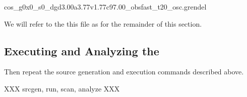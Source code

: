 \begin{snippet}
  cos_g0x0_s0_dgd3.00a3.77v1.77c97.00_obsfast_t20_osc.grendel
\end{snippet}

We will refer to the this file as  for the remainder
of this section.

\subsection{Executing and Analyzing the }




Then repeat the source generation and execution commands described above.

XXX srcgen, run, scan, analyze XXX